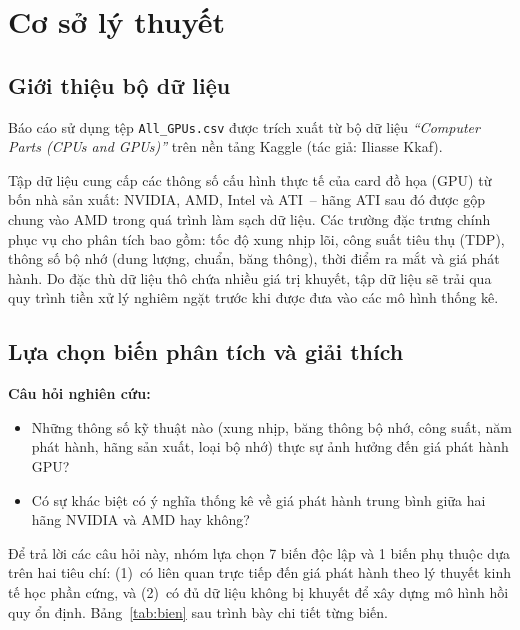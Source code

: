 \documentclass[12pt,a4paper]{article}
\begin{document}
\section{Cơ sở lý thuyết}

\subsection{Giới thiệu bộ dữ liệu}

Báo cáo sử dụng tệp \texttt{All\_GPUs.csv} được trích xuất từ bộ dữ liệu
\textit{``Computer Parts (CPUs and GPUs)''} trên nền tảng Kaggle (tác giả: Iliasse Kkaf).

Tập dữ liệu cung cấp các thông số cấu hình thực tế của card đồ họa (GPU) từ bốn nhà sản
xuất: NVIDIA, AMD, Intel và ATI~-- hãng ATI sau đó được gộp chung vào AMD trong quá trình
làm sạch dữ liệu. Các trường đặc trưng chính phục vụ cho phân tích bao gồm: tốc độ xung
nhịp lõi, công suất tiêu thụ (TDP), thông số bộ nhớ (dung lượng, chuẩn, băng thông), thời
điểm ra mắt và giá phát hành. Do đặc thù dữ liệu thô chứa nhiều giá trị khuyết, tập dữ
liệu sẽ trải qua quy trình tiền xử lý nghiêm ngặt trước khi được đưa vào các mô hình
thống kê.

\subsection{Lựa chọn biến phân tích và giải thích}

\textbf{Câu hỏi nghiên cứu:}

\begin{itemize}[leftmargin=1.5em]
  \item Những thông số kỹ thuật nào (xung nhịp, băng thông bộ nhớ, công suất, năm phát
        hành, hãng sản xuất, loại bộ nhớ) thực sự ảnh hưởng đến giá phát hành GPU?

  \item Có sự khác biệt có ý nghĩa thống kê về giá phát hành trung bình giữa hai hãng
        NVIDIA và AMD hay không?
\end{itemize}

Để trả lời các câu hỏi này, nhóm lựa chọn 7 biến độc lập và 1 biến phụ thuộc dựa trên
hai tiêu chí: (1)~có liên quan trực tiếp đến giá phát hành theo lý thuyết kinh tế học
phần cứng, và (2)~có đủ dữ liệu không bị khuyết để xây dựng mô hình hồi quy ổn định.
Bảng~\ref{tab:bien} sau trình bày chi tiết từng biến.
\end{document}
